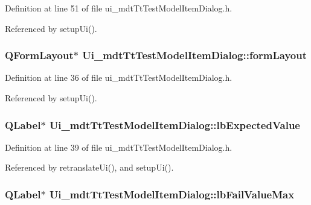 Definition at line 51 of file ui\-\_\-mdt\-Tt\-Test\-Model\-Item\-Dialog.\-h.



Referenced by setup\-Ui().

\hypertarget{class_ui__mdt_tt_test_model_item_dialog_a68c02a58311dda26d6512a9d5dd0db02}{
\subsubsection[{form\-Layout}]{\setlength{\rightskip}{0pt plus 5cm}Q\-Form\-Layout$\ast$ Ui\-\_\-mdt\-Tt\-Test\-Model\-Item\-Dialog\-::form\-Layout}}\label{class_ui__mdt_tt_test_model_item_dialog_a68c02a58311dda26d6512a9d5dd0db02}


Definition at line 36 of file ui\-\_\-mdt\-Tt\-Test\-Model\-Item\-Dialog.\-h.



Referenced by setup\-Ui().

\hypertarget{class_ui__mdt_tt_test_model_item_dialog_a71d811dd8130e8fafff219d8735abdcc}{
\subsubsection[{lb\-Expected\-Value}]{\setlength{\rightskip}{0pt plus 5cm}Q\-Label$\ast$ Ui\-\_\-mdt\-Tt\-Test\-Model\-Item\-Dialog\-::lb\-Expected\-Value}}\label{class_ui__mdt_tt_test_model_item_dialog_a71d811dd8130e8fafff219d8735abdcc}


Definition at line 39 of file ui\-\_\-mdt\-Tt\-Test\-Model\-Item\-Dialog.\-h.



Referenced by retranslate\-Ui(), and setup\-Ui().

\hypertarget{class_ui__mdt_tt_test_model_item_dialog_a31ddda4aacca73964d0c13b71462cc59}{
\subsubsection[{lb\-Fail\-Value\-Max}]{\setlength{\rightskip}{0pt plus 5cm}Q\-Label$\ast$ Ui\-\_\-mdt\-Tt\-Test\-Model\-Item\-Dialog\-::lb\-Fail\-Value\-Max}}\label{class_ui__mdt_tt_test_model_item_dialog_a31ddda4aacca73964d0c13b71462cc59}


